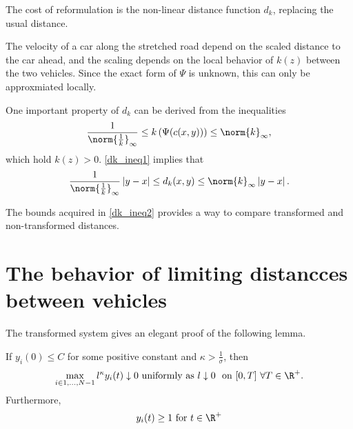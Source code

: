 The cost of reformulation is the non-linear distance function $d_k$, replacing the usual distance. 

The velocity of a car along the stretched road depend on the scaled distance to the car ahead, and the scaling depends on the local behavior of $k(z)$ between the two vehicles. Since the exact form of $\Psi$ is unknown, this can only be approxmiated locally. %

One important property of $d_k$ can be derived from the inequalities 
\begin{equation} \label{dk_ineq1}
	\frac{1}{\norm{\frac{1}{k}}_\infty} \leq k\left(\Psi(c(x,y))\right) \leq \norm{k}_\infty, 
\end{equation} 
which hold $k(z) > 0$. \eqref{dk_ineq1} implies that 
\begin{align} \label{dk_ineq2}
	\frac{1}{\norm{\frac{1}{k}}_\infty} \left| y - x\right| \leq d_k(x,y)  \leq  \norm{k}_\infty \left| y - x\right|. 
\end{align}

The bounds acquired in \eqref{dk_ineq2} provides a way to compare transformed and non-transformed distances.


\section{The behavior of limiting distancces between vehicles} \label{section:distance_cars}

The transformed system gives an elegant proof of the following lemma. 
\begin{lemma} \label{lemma:boundY}
	If $y_i(0) \leq C$ for some positive constant and $\kappa > \frac{1}{\sigma}$, then 
	\begin{equation}
		\max_{i \in {1,...,N-1}} l^\kappa y_i(t) \downarrow 0\text{ uniformly as } l \downarrow 0 \, \, \text{ on } [0,T] \,\, \forall T \in \R^+. 
	\end{equation}
	Furthermore, 
	\begin{equation}
		y_i(t) \geq 1 \text{ for } t \in \R^+
 	\end{equation}
\end{lemma}




